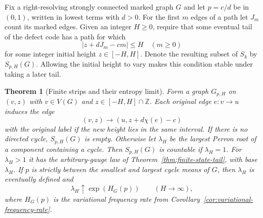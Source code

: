 \documentclass[11pt]{article}
\newtheorem{theorem}{Theorem}
\theoremstyle{definition}
\theoremstyle{remark}
\newcommand{\Z}{\mathbb{Z}}
\begin{document}
Fix a right-resolving strongly connected marked graph $G$ and
let $p=c/d$ be in $(0,1)$, written in lowest terms with $d>0$.
For the first $m$ edges of a path let $J_m$ count its marked edges.
Given an integer $H\ge0$, require that some eventual tail of the
defect code has a path for which
\[
 |z+dJ_m-cm|\le H\quad(m\ge0)
\]
for some integer initial height $z\in[-H,H]$. Denote the resulting
subset of $S_k$ by $S_{p,H}(G)$. Allowing the initial height to vary
makes this condition stable under taking a later tail.

\begin{theorem}[Finite strips and their entropy limit]\label{thm:frequency-strip}
Form a graph $G_{p,H}$ on $(v,z)$ with $v\in V(G)$ and
$z\in[-H,H]\cap\Z$. Each original edge $e:v\to u$ induces the edge
\[
 (v,z)\longrightarrow(u,z+d\chi(e)-c)
\]
with the original label if the new height lies in the same interval.
If there is no directed cycle, $S_{p,H}(G)$ is empty. Otherwise let
$\lambda_H$ be the largest Perron root of a component containing
a cycle. Then $S_{p,H}(G)$ is countable if $\lambda_H=1$.
For $\lambda_H>1$ it has the arbitrary-gauge law of
Theorem~\ref{thm:finite-state-tail}, with base $\lambda_H$.
If $p$ is strictly between the smallest and largest cycle means of $G$,
then $\lambda_H$ is eventually defined and
\[
 \lambda_H\uparrow \exp(H_G(p))\qquad(H\to\infty),
\]
where $H_G(p)$ is the variational frequency rate from
Corollary~\ref{cor:variational-frequency-rate}.
\end{theorem}
\end{document}
